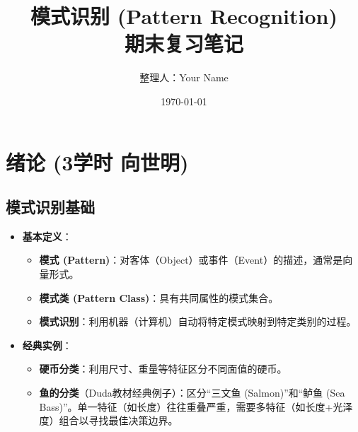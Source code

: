\documentclass[a4paper, 11pt]{ctexart}
\title{\textbf{模式识别 (Pattern Recognition) \\ 期末复习笔记}}
\author{整理人：Your Name}
\date{\today}
\begin{document}
\maketitle
\tableofcontents
\newpage %


\section{绪论 \small{(3学时 向世明)}}

\subsection{模式识别基础}
\begin{itemize}
    \item \textbf{基本定义}：
    \begin{itemize}
        \item \textbf{模式 (Pattern)}：对客体（Object）或事件（Event）的描述，通常是向量形式。
        \item \textbf{模式类 (Pattern Class)}：具有共同属性的模式集合。
        \item \textbf{模式识别}：利用机器（计算机）自动将特定模式映射到特定类别的过程。
    \end{itemize}
    \item \textbf{经典实例}：
    \begin{itemize}
        \item \textbf{硬币分类}：利用尺寸、重量等特征区分不同面值的硬币。
        \item \textbf{鱼的分类}（Duda教材经典例子）：区分“三文鱼 (Salmon)”和“鲈鱼 (Sea Bass)”。单一特征（如长度）往往重叠严重，需要多特征（如长度+光泽度）组合以寻找最佳决策边界。
    \end{itemize}
\end{itemize}
\end{document}
